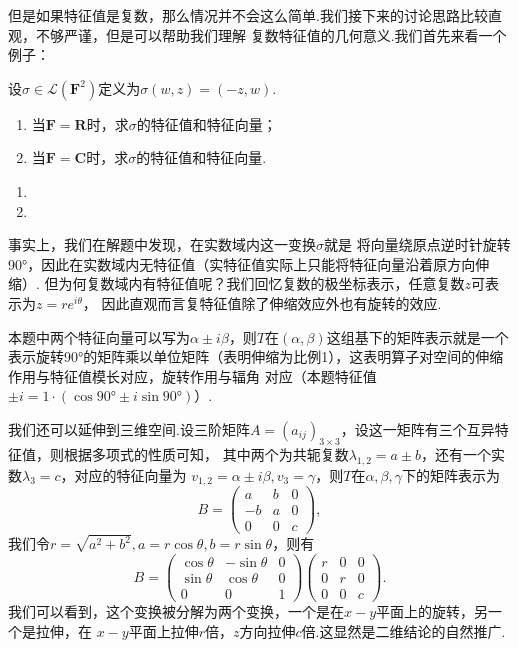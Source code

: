 但是如果特征值是复数，那么情况并不会这么简单.我们接下来的讨论思路比较直观，不够严谨，但是可以帮助我们理解
复数特征值的几何意义.我们首先来看一个例子：
\begin{example}
    设$\sigma\in\mathcal{L}(\mathbf{F}^2)$定义为$\sigma(w,z)=(-z,w)$.
    \begin{enumerate}[label=(\arabic*)]
        \item 当$\mathbf{F}=\mathbf{R}$时，求$\sigma$的特征值和特征向量；
        \item 当$\mathbf{F}=\mathbf{C}$时，求$\sigma$的特征值和特征向量.
    \end{enumerate}
\end{example}
\begin{solution}
    \begin{enumerate}[label=(\arabic*)]
        \item 
        \item 
    \end{enumerate}
\end{solution}

事实上，我们在解题中发现，在实数域内这一变换$\sigma$就是
将向量绕原点逆时针旋转90°，因此在实数域内无特征值（实特征值实际上只能将特征向量沿着原方向伸缩）.
但为何复数域内有特征值呢？我们回忆复数的极坐标表示，任意复数$z$可表示为$z=re^{i\theta}$，
因此直观而言复特征值除了伸缩效应外也有旋转的效应.

本题中两个特征向量可以写为$\alpha\pm i\beta$，则$T$在$(\alpha,\beta)$这组基下的矩阵表示就是一个
表示旋转90°的矩阵乘以单位矩阵（表明伸缩为比例1），这表明算子对空间的伸缩作用与特征值模长对应，旋转作用与辐角
对应（本题特征值$\pm i=1\cdot(\cos 90°\pm i\sin 90°)$）.

我们还可以延伸到三维空间.设三阶矩阵$A=(a_{ij})_{3\times 3}$，设这一矩阵有三个互异特征值，则根据多项式的性质可知，
其中两个为共轭复数$\lambda_{1,2}=a\pm b$，还有一个实数$\lambda_3=c$，对应的特征向量为
$v_{1,2}=\alpha\pm i\beta,v_3=\gamma$，则$T$在$\alpha,\beta,\gamma$下的矩阵表示为
$$B=\begin{pmatrix}
	a & b & 0 \\ -b & a & 0 \\ 0 & 0 & c
\end{pmatrix},$$
我们令$r=\sqrt{a^2+b^2},a=r\cos\theta,b=r\sin\theta$，则有
$$B=\begin{pmatrix}
	\cos\theta & -\sin\theta & 0 \\ \sin\theta & \cos\theta & 0 \\ 0 & 0 & 1
\end{pmatrix}\begin{pmatrix}
	r & 0 & 0 \\ 0 & r & 0 \\ 0 & 0 & c
\end{pmatrix}.$$
我们可以看到，这个变换被分解为两个变换，一个是在$x-y$平面上的旋转，另一个是拉伸，在
$x-y$平面上拉伸$r$倍，$z$方向拉伸$c$倍.这显然是二维结论的自然推广.


